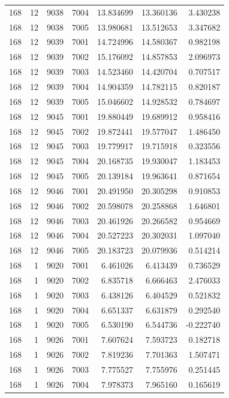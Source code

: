 \begin{table}
\begin{tabular}{rrrrrrr}
168 & 12 & 9038 & 7004 & 13.834699 & 13.360136 & 3.430238 \\
168 & 12 & 9038 & 7005 & 13.980681 & 13.512653 & 3.347682 \\
168 & 12 & 9039 & 7001 & 14.724996 & 14.580367 & 0.982198 \\
168 & 12 & 9039 & 7002 & 15.176092 & 14.857853 & 2.096973 \\
168 & 12 & 9039 & 7003 & 14.523460 & 14.420704 & 0.707517 \\
168 & 12 & 9039 & 7004 & 14.904359 & 14.782115 & 0.820187 \\
168 & 12 & 9039 & 7005 & 15.046602 & 14.928532 & 0.784697 \\
168 & 12 & 9045 & 7001 & 19.880449 & 19.689912 & 0.958416 \\
168 & 12 & 9045 & 7002 & 19.872441 & 19.577047 & 1.486450 \\
168 & 12 & 9045 & 7003 & 19.779917 & 19.715918 & 0.323556 \\
168 & 12 & 9045 & 7004 & 20.168735 & 19.930047 & 1.183453 \\
168 & 12 & 9045 & 7005 & 20.139184 & 19.963641 & 0.871654 \\
168 & 12 & 9046 & 7001 & 20.491950 & 20.305298 & 0.910853 \\
168 & 12 & 9046 & 7002 & 20.598078 & 20.258868 & 1.646801 \\
168 & 12 & 9046 & 7003 & 20.461926 & 20.266582 & 0.954669 \\
168 & 12 & 9046 & 7004 & 20.527223 & 20.302031 & 1.097040 \\
168 & 12 & 9046 & 7005 & 20.183723 & 20.079936 & 0.514214 \\
168 & 1 & 9020 & 7001 & 6.461026 & 6.413439 & 0.736529 \\
168 & 1 & 9020 & 7002 & 6.835718 & 6.666463 & 2.476033 \\
168 & 1 & 9020 & 7003 & 6.438126 & 6.404529 & 0.521832 \\
168 & 1 & 9020 & 7004 & 6.651337 & 6.631879 & 0.292540 \\
168 & 1 & 9020 & 7005 & 6.530190 & 6.544736 & -0.222740 \\
168 & 1 & 9026 & 7001 & 7.607624 & 7.593723 & 0.182718 \\
168 & 1 & 9026 & 7002 & 7.819236 & 7.701363 & 1.507471 \\
168 & 1 & 9026 & 7003 & 7.775527 & 7.755976 & 0.251445 \\
168 & 1 & 9026 & 7004 & 7.978373 & 7.965160 & 0.165619 \\

\end{tabular}
\end{table}
